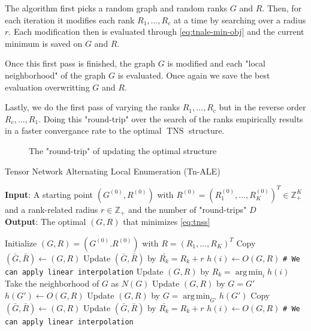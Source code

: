 \documentclass[11pt,a4paper,openright,oneside]{book}
\numberwithin{equation}{section}
\newcommand{\refeq}[1]{\cref{#1}}
\DeclareMathOperator{\TNS}{TNS}
\DeclareMathOperator*{\argmin}{arg\,min}
\begin{document}
{The algorithm first picks a random graph and random ranks $G$ and $R$. Then, for each iteration it modifies 
each rank $R_1, \dots, R_c$ at a time by searching over a radius $r$. Each modification then is evaluated through
\eqref{eq:tnale-min-obj} and the current minimum is saved on $G$ and $R$.

Once this first pass is finished, the graph $G$ is modified and each "local neighborhood" of the graph $G$ is evaluated.
Once again we save the best evaluation overwritting $G$ and $R$.

Lastly, we do the first pass of varying the ranks $R_1, \dots, R_c$ but in the reverse order $R_c, \dots, R_1$.
Doing this "round-trip" over the search of the ranks empirically results in a faster convergance rate to the
optimal $\TNS$ structure.

\begin{figure}[H]
    \centering
{}
    \caption{The "round-trip" of updating the optimal structure}
\end{figure}


\begin{algorithm}[h]
    \caption{Tensor Network Alternating Local Enumeration (Tn-ALE)}

    \hspace*{\algorithmicindent} \textbf{Input}: A starting point $(G^{(0)}, R^{(0)})$ with $R^{(0)} = (R_1^{(0)}, \dots, R_K^{(0)})^T \in \mathbb{Z}_+^K$ 
    and a rank-related radius $r \in \mathbb{Z}_+$ and the number of "round-trips" $D$ \\ 
    \hspace*{\algorithmicindent} \textbf{Output}: The optimal $(G, R)$ that minimizes \refeq{eq:tnss}

    \begin{algorithmic}[1]
        \State Initialize $(G, R) = (G^{(0)}. R^{(0)})$ with $R = (R_1, \dots, R_K)^T$
                    \State Copy $(\bar{G}, \bar{R}) \leftarrow (G, R)$
                    \State Update $(\bar{G}, \bar{R})$ by $\bar{R_k} = R_k + r$
                    \State $h(i) \leftarrow O(G, R)$ \qquad \verb/# We can apply linear interpolation/
                \EndFor
                \State Update $(G, R)$ by $R_k = \argmin_i h(i)$
            \EndFor
            \State Take the neighborhood of $G$ as $N(G)$
                \State Update $(G, R)$ by $G = G'$
                \State $h(G') \leftarrow O(G, R)$
            \EndFor
            \State Update $(G, R)$ by $G = \argmin_{G'} h(G')$
                    \State Copy $(\bar{G}, \bar{R}) \leftarrow (G, R)$
                    \State Update $(\bar{G}, \bar{R})$ by $\bar{R_k} = R_k + r$
                    \State $h(i) \leftarrow O(G, R)$ \qquad  \verb/# We can apply linear interpolation/


\end{algorithmic}
\end{algorithm}}
\end{document}
